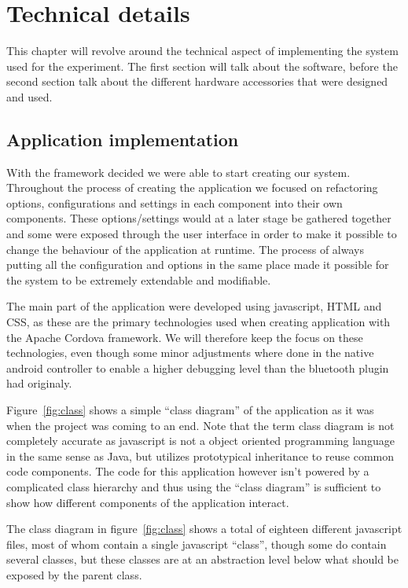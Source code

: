 \chapter{Technical details}\label{ch:technical}
This chapter will revolve around the technical aspect of implementing the system used for the experiment. The first section will talk about the software, before the second section talk about the different hardware accessories that were designed and used.


\section{Application implementation}
With the framework decided we were able to start creating our system. 
Throughout the process of creating the application we focused on refactoring options, configurations and settings in each component into their own components. These options/settings would at a later stage be gathered together and some were exposed through the user interface in order to make it possible to change the behaviour of the application at runtime. The process of always putting all the configuration and options in the same place made it possible for the system to be extremely extendable and modifiable. 

\bigskip\noindent
The main part of the application were developed using javascript, HTML and CSS, as these are the primary technologies used when creating application with the Apache Cordova framework. We will therefore keep the focus on these technologies, even though some minor adjustments where done in the native android controller to enable a higher debugging level than the bluetooth plugin had originaly.

\bigskip\noindent
Figure~\ref{fig:class} shows a simple "`class diagram"' of the application as it was when the project was coming to an end. Note that the term class diagram is not completely accurate as javascript is not a object oriented programming language in the same sense as Java, but utilizes prototypical inheritance to reuse common code components. The code for this application however isn't powered by a complicated class hierarchy and thus using the "`class diagram"' is sufficient to show how different components of the application interact.


\bigskip\noindent
The class diagram in figure~\ref{fig:class} shows a total of eighteen different javascript files, most of whom contain a single javascript "`class"', though some do contain several classes, but these classes are at an abstraction level below what should be exposed by the parent class. 

